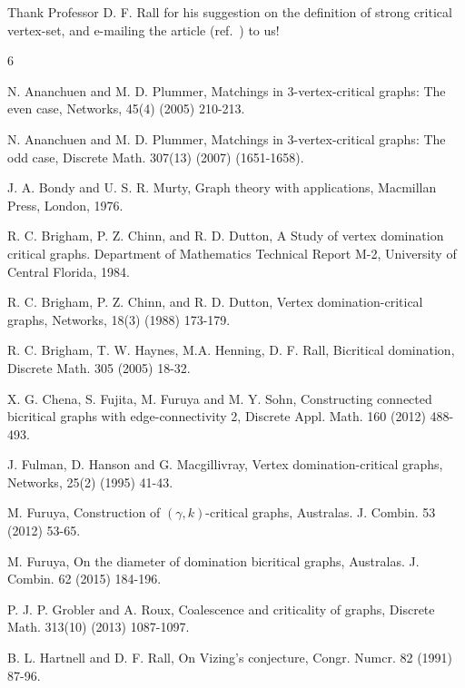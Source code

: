 \documentclass[a4paper,11pt]{article}
\numberwithin{equation}{section}
\begin{document}
\vspace{-1mm}
Thank Professor D. F. Rall for his suggestion on the definition of strong critical vertex-set,  and e-mailing the article (ref.~\cite{Phillips}) to us\hspace{1pt}!


\begin{thebibliography}{6}
{\small

\vspace{-1mm}
 N. Ananchuen and M. D. Plummer, Matchings in 3-vertex-critical graphs: The even case, Networks, 45(4) (2005) 210-213.

 N. Ananchuen and M. D. Plummer, Matchings in 3-vertex-critical graphs: The odd case, Discrete Math. 307(13) (2007) (1651-1658).

 J. A. Bondy and U. S. R. Murty, Graph theory with applications, Macmillan Press, London, 1976.

 R. C. Brigham, P. Z. Chinn, and R. D. Dutton, A Study of vertex domination critical graphs. Department of Mathematics Technical Report M-2, University of Central Florida, 1984.

 R. C. Brigham, P. Z. Chinn, and R. D. Dutton, Vertex domination-critical graphs, Networks,  18(3) (1988) 173-179.

 R. C. Brigham, T. W. Haynes, M.A. Henning, D. F. Rall, Bicritical domination, Discrete Math. 305 (2005) 18-32.

 X. G. Chena,  S. Fujita,  M. Furuya and M. Y. Sohn, Constructing connected bicritical graphs with edge-connectivity 2, Discrete Appl. Math. 160 (2012) 488-493.

 J. Fulman, D. Hanson and G. Macgillivray, Vertex domination-critical graphs, Networks, 25(2) (1995) 41-43.

 M. Furuya,  Construction of $(\gamma,k)$-critical graphs, Australas. J. Combin. 53 (2012) 53-65.

 M. Furuya, On the diameter of domination bicritical graphs, Australas. J. Combin. 62 (2015) 184-196.



 P. J. P. Grobler and A. Roux, Coalescence and criticality of graphs, Discrete Math.  313(10) (2013) 1087-1097.

 B. L. Hartnell and D. F. Rall, On Vizing's conjecture, Congr. Numcr. 82 (1991) 87-96.

}
\end{thebibliography}
\end{document}
